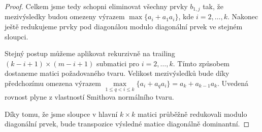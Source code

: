 \begin{proof}
Celkem jsme tedy schopni eliminovat všechny prvky $ b_{1,j} $ tak, že  
mezivýsledky budou omezeny výrazem $ \max\{ a_i + a_1 a_i \} $, kde 
$ i = 2,\dots,k $. Nakonec ještě redukujeme prvky pod diagonálou modulo 
diagonální prvek ve stejném sloupci.

Stejný postup můžeme aplikovat rekurzivně na trailing
$ (k - i + 1) \times (m - i + 1) $ submatici pro $ i = 2,\dots, k $. Tímto 
způsobem dostaneme matici požadovaného tvaru. Velikost mezivýsledků bude 
díky předchozímu omezena výrazem 
$ \max\limits_{1 \leq q < i \leq k}\{ a_i + a_q a_i \} = a_k + a_{k - 1} a_k $.
Uvedená rovnost plyne z vlastností Smithova normálního tvaru. 

Díky tomu, že jsme sloupce v hlavní $ k \times k $ matici průběžně redukovali
modulo diagonální prvek, bude transpozice výsledné matice diagonálně dominantní.
\end{proof}

